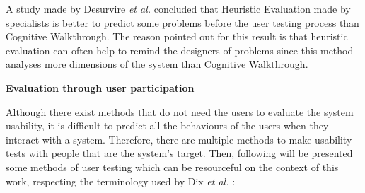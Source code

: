 A study made by Desurvire \textit{et al.} \cite{WhatIsGainedAndLostWhenUsingMethodsOtherThanEmpiricalTesting} concluded that Heuristic Evaluation made by specialists is better to predict some problems before the user testing process than Cognitive Walkthrough. The reason pointed out for this result is that heuristic evaluation can often help to remind the designers of problems since this method analyses more dimensions of the system than Cognitive Walkthrough.

\bigskip

\textbf{Evaluation through user participation}

Although there exist methods that do not need the users to evaluate the system usability, it is difficult to predict all the behaviours of the users when they interact with a system. Therefore, there are multiple methods to make usability tests with people that are the system's target. Then, following will be presented some methods of user testing which can be resourceful on the context of this work, respecting the terminology used by Dix \textit{et al.} \cite{humanComputerInteraction}:

